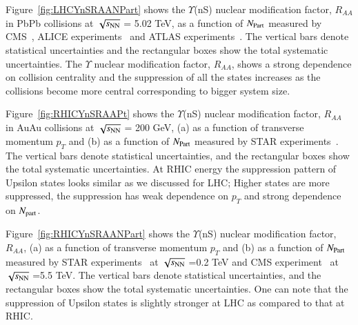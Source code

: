 Figure~\ref{fig:LHCYnSRAANPart} shows
the $\Upsilon$(nS) nuclear modification factor, $R_{AA}$
in PbPb collisions at $\sqrt{s_{\rm NN}}$ = 5.02 TeV, as a function of $N_{\rm Part}$
measured by CMS~\cite{CMS:2018zza}, ALICE experiments~\cite{ALICE:2020wwx}
and ATLAS experiments~\cite{ALICE:2020wwx}.
 The vertical bars denote statistical uncertainties and the rectangular
boxes show the total systematic uncertainties. The $\Upsilon$ nuclear modification
factor, $R_{AA}$, shows a strong dependence on collision centrality and the
suppression of all the states increases as the collisions become more central
corresponding to bigger system size. 

    
Figure~\ref{fig:RHICYnSRAAPt} shows the $\Upsilon$(nS) nuclear modification factor, $R_{AA}$
in AuAu collisions at $\sqrt{s_{\rm NN}}$ = 200 GeV,
 (a) as a function of transverse momentum $p_{T}$
and (b) as a function of $N_{\rm Part}$ measured by STAR
experiments~\cite{Wang:2019vau}. The vertical bars denote
statistical uncertainties, and the rectangular boxes show the total systematic
uncertainties. At RHIC energy the suppression pattern of Upsilon states
looks similar as we discussed for LHC; Higher states are more suppressed,
the suppression has weak dependence on $p_T$ and strong dependence on $N_{\rm part}$.



Figure~\ref{fig:RHICYnSRAANPart} shows
  the $\Upsilon$(nS) nuclear modification factor, $R_{AA}$, (a) as a function of transverse momentum $p_{T}$
  and (b) as a function of $N_{\rm Part}$ measured by STAR experiments~\cite{Wang:2019vau} at $\sqrt{s_{\rm NN}}$ =0.2 TeV and
  CMS experiment~\cite{CMS:2018zza} at $\sqrt{s_{\rm NN}}$ =5.5 TeV.
The vertical bars denote statistical uncertainties, and the
rectangular boxes show the total systematic uncertainties.
One can note that the suppression of Upsilon states is slightly stronger at
LHC as compared to that at RHIC.   


  


